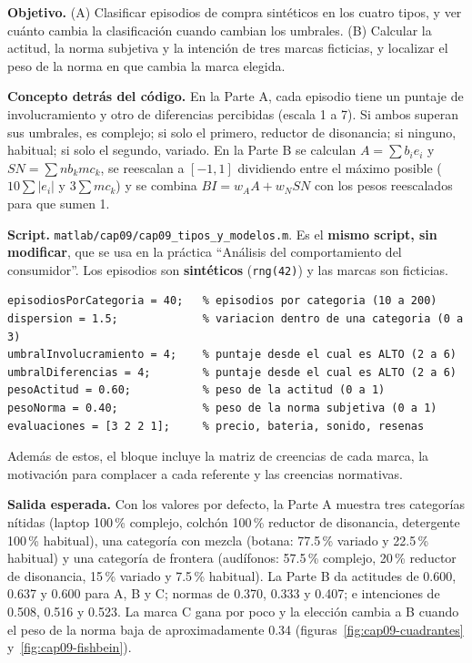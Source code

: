 \begin{cajaLaboratorio}
\textbf{Objetivo.} (A) Clasificar episodios de compra sintéticos en los cuatro
tipos, y ver cuánto cambia la clasificación cuando cambian los umbrales. (B)
Calcular la actitud, la norma subjetiva y la intención de tres marcas
ficticias, y localizar el peso de la norma en que cambia la marca elegida.

\textbf{Concepto detrás del código.} En la Parte A, cada episodio tiene un
puntaje de involucramiento y otro de diferencias percibidas (escala 1 a 7).
Si ambos superan sus umbrales, es complejo; si solo el primero, reductor de
disonancia; si ninguno, habitual; si solo el segundo, variado. En la Parte B se
calculan $A=\sum b_i e_i$ y $SN=\sum nb_k mc_k$, se reescalan a $[-1,1]$
dividiendo entre el máximo posible ($10\sum|e_i|$ y $3\sum mc_k$) y se combina
$BI=w_A A + w_N SN$ con los pesos reescalados para que sumen 1.

\textbf{Script.} \texttt{matlab/cap09/cap09\_tipos\_y\_modelos.m}. Es el
\textbf{mismo script, sin modificar}, que se usa en la práctica
\enquote{Análisis del comportamiento del consumidor}. Los episodios son
\textbf{sintéticos} (\texttt{rng(42)}) y las marcas son ficticias.

\begin{lstlisting}[style=MATLABStyle, caption={Bloque de parámetros editable (\texttt{cap09\_tipos\_y\_modelos.m}) — es lo único que cambia entre corridas.}]
episodiosPorCategoria = 40;   % episodios por categoria (10 a 200)
dispersion = 1.5;             % variacion dentro de una categoria (0 a 3)
umbralInvolucramiento = 4;    % puntaje desde el cual es ALTO (2 a 6)
umbralDiferencias = 4;        % puntaje desde el cual es ALTO (2 a 6)
pesoActitud = 0.60;           % peso de la actitud (0 a 1)
pesoNorma = 0.40;             % peso de la norma subjetiva (0 a 1)
evaluaciones = [3 2 2 1];     % precio, bateria, sonido, resenas
\end{lstlisting}

Además de estos, el bloque incluye la matriz de creencias de cada marca, la
motivación para complacer a cada referente y las creencias normativas.

\textbf{Salida esperada.} Con los valores por defecto, la Parte A muestra
tres categorías nítidas (laptop 100\,\% complejo, colchón 100\,\% reductor de
disonancia, detergente 100\,\% habitual), una categoría con mezcla (botana:
77.5\,\% variado y 22.5\,\% habitual) y una categoría de frontera (audífonos:
57.5\,\% complejo, 20\,\% reductor de disonancia, 15\,\% variado y 7.5\,\%
habitual). La Parte B da actitudes de 0.600, 0.637 y 0.600 para A, B y C;
normas de 0.370, 0.333 y 0.407; e intenciones de 0.508, 0.516 y 0.523. La marca C
gana por poco y la elección cambia a B cuando el peso de la norma baja de
aproximadamente 0.34 (figuras~\ref{fig:cap09-cuadrantes} y~\ref{fig:cap09-fishbein}).


\end{cajaLaboratorio}
